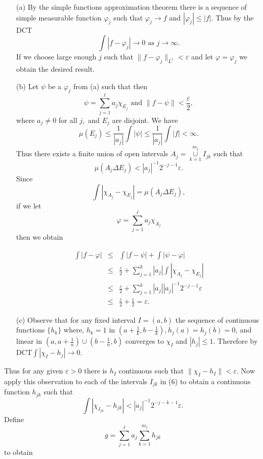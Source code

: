 \documentclass[12pt]{report}
\begin{document}
\begin{itemize}
\item[(a)]  By the simple functions approximation theorem there is a
sequence of simple measurable function $\varphi_j$ such that $\varphi_j
\longrightarrow f$ and $|\varphi_j| \le |f|$.  Thus by the DCT
\[
 \int |f - \varphi_j| 
\longrightarrow 0 \mbox{ as } j \to
\infty.
\] If we choose large enough $j$ such that $\|f-\varphi_j\|_{L^1} <
\varepsilon$ and let
$\varphi = \varphi_j$ we obtain the desired result.
\item[(b)]  Let $\psi$ be a $\varphi_j$ from (a) such that then
\[
\psi = \sum^\ell_{j=1} a_j \chi_{E_j} \mbox{ and } \|f - \psi\| <
\frac{\varepsilon}{2},
\] where $a_j \ne 0 $ for all $j, $ and $E_j$ are disjoint.  We have
\[
\mu(E_j) \le \frac{1}{|a_j|} \int |\psi| \le \frac{1}{|a_j|} \int |f| < \infty.
\] Thus there exists a finite union of open intervals $A_j =
\overset{m_j}{\underset{k=1}{\cup}} I_{jk}$ such that
\[
\mu(A_j \Delta E_j) <|a_j|^{-1} 2^{-j-1} \varepsilon.
\] Since
\[
\int |\chi_{A_j} - \chi_{E_j} | = \mu(A_j \Delta E_j),
\] if we let
\[
\varphi = \sum^\ell_{j=1} a_j \chi_{A_j}
\] then we obtain

\begin{eqnarray*}
\int |f - \varphi| &\le& \int |f - \psi| + \int |\psi - \varphi|\\ &\le&
\frac{\varepsilon}{2} + \sum^k_{j=1} |a_j| \int |\chi_{A_j} - \chi_{E_j}|\\
&\le& \frac{\varepsilon}{2} + \sum^k_{j=1} |a_j| |a_j|^{-1} 2^{-j-1}
\varepsilon\\ &\le& \frac{\varepsilon}{2} + \frac{\varepsilon}{2} =
\varepsilon.
\end{eqnarray*}
\item[(c)]  Observe that for any fixed interval $I = (a, b)$ the sequence
of continuous functions $\{h_k\}$ where, $h_k = 1$ in $(a + \frac{1}{k}, b -
\frac{1}{k}), h_j (a) = h_j(b) = 0$, and linear in $(a, a + \frac{1}{n}) \cup (b
- \frac{1}{n}, b)$ converges to $\chi_I$ and 
$|h_j| \le 1$.  Therefore by   DCT$ \int |\chi_I - h_j|
\longrightarrow 0$.
\end{itemize}

\noindent Thus for any given $\varepsilon > 0$ there is $h_I$ continuous
such  that $\|\chi_I - h_I \| < \varepsilon$.  Now apply this observation to
each of the intervals $I_{jk}$ in (6) to obtain a continuous function
$h_{jk}$ such that
\[
\int |\chi_{I_{jk}} - h_{jk} | < |a_j|^{-1} 2^{-j-k-1} \varepsilon.
\] Define
\[ g = \sum^\ell_{j=1} a_j \sum^{m_j}_{k=1} h_{jk}
\] to obtain
\end{document}
